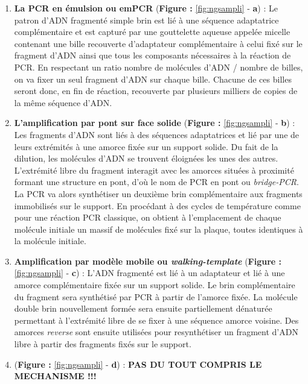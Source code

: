 \documentclass[12pt,twoside]{reedthesis}
\providecommand{\tightlist}{%
  \setlength{\itemsep}{0pt}\setlength{\parskip}{0pt}}
\theoremstyle{definition}
\theoremstyle{definition}
\theoremstyle{remark}
\begin{document}
  \begin{enumerate}
  \def\labelenumi{\arabic{enumi}.}
  \tightlist
  \item
    \textbf{La PCR en émulsion ou emPCR} (\textbf{Figure :
    }\ref{fig:ngsampli} - \textbf{a}) : Le patron d'ADN fragmenté simple
    brin est lié à une séquence adaptatrice complémentaire et est capturé
    par une gouttelette aqueuse appelée micelle contenant une bille
    recouverte d'adaptateur complémentaire à celui fixé sur le fragment
    d'ADN ainsi que tous les composants nécessaires à la réaction de PCR.
    En respectant un ratio nombre de molécules d'ADN / nombre de billes,
    on va fixer un seul fragment d'ADN sur chaque bille. Chacune de ces
    billes seront donc, en fin de réaction, recouverte par plusieurs
    milliers de copies de la même séquence d'ADN.\\
  \item
    \textbf{L'amplification par pont sur face solide} (\textbf{Figure :
    }\ref{fig:ngsampli} - \textbf{b}) : Les fragments d'ADN sont liés à
    des séquences adaptatrices et lié par une de leurs extrémités à une
    amorce fixée sur un support solide. Du fait de la dilution, les
    molécules d'ADN se trouvent éloignées les unes des autres. L'extrémité
    libre du fragment interagit avec les amorces situées à proximité
    formant une structure en pont, d'où le nom de PCR en pont ou
    \emph{bridge-PCR}. La PCR va alors synthétiser un deuxième brin
    complémentaire aux fragments immobilisés sur le support. En procédant
    à des cycles de température comme pour une réaction PCR classique, on
    obtient à l'emplacement de chaque molécule initiale un massif de
    molécules fixé sur la plaque, toutes identiques à la molécule
    initiale.\\
  \item
    \textbf{Amplification par modèle mobile ou \emph{walking-template}
    }(\textbf{Figure : }\ref{fig:ngsampli} - \textbf{c}) : L'ADN fragmenté
    est lié à un adaptateur et lié à une amorce complémentaire fixée sur
    un support solide. Le brin complémentaire du fragment sera synthétisé
    par PCR à partir de l'amorce fixée. La molécule double brin
    nouvellement formée sera ensuite partiellement dénaturée permettant à
    l'extrémité libre de se fixer à une séquence amorce voisine. Des
    amorces \emph{reverse} sont ensuite utilisées pour resynthétiser un
    fragment d'ADN libre à partir des fragments fixés sur le support.\\
  \item
    (\textbf{Figure : }\ref{fig:ngsampli} - \textbf{d}) : \textbf{PAS DU
    TOUT COMPRIS LE MECHANISME !!! }
  \end{enumerate}
  
\end{document}

